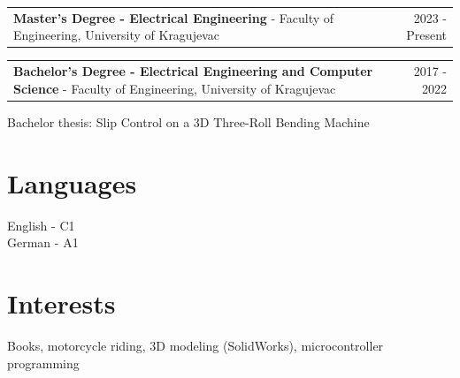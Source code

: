 \documentclass[11pt,a4paper]{article}
\makeatletter
\newcommand{\cventry}[2]{%
\noindent
\begin{tabular*}{\textwidth}{@{}p{0.8\textwidth}@{\extracolsep{\fill}}r@{}}
#1 & #2 \\
\end{tabular*}
}
\makeatother
\begin{document}
\cventry{\textbf{Master's Degree - Electrical Engineering} - Faculty of Engineering, University of Kragujevac}{2023 - Present}

\vspace{4pt}

\cventry{\textbf{Bachelor's Degree - Electrical Engineering and Computer Science} - Faculty of Engineering, University of Kragujevac}{2017 - 2022}

Bachelor thesis: Slip Control on a 3D Three-Roll Bending Machine


\section*{Languages}

English - C1 \\
German - A1


\section*{Interests}

Books, motorcycle riding, 3D modeling (SolidWorks), microcontroller programming
\end{document}
